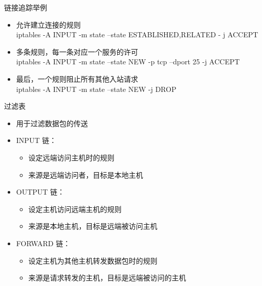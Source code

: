  \begin{frame}{链接追踪举例}
\begin{itemize}
\item 允许建立连接的规则\\
iptables -A INPUT -m state --state ESTABLISHED,RELATED - j ACCEPT
\item 多条规则，每一条对应一个服务的许可\\
iptables -A INPUT -m state --state NEW -p tcp --dport 25 -j ACCEPT
\item 最后，一个规则阻止所有其他入站请求\\
iptables -A INPUT -m state --state NEW -j DROP
\end{itemize}

\end{frame} 
 \begin{frame}{过滤表}


\begin{itemize}
\item 用于过滤数据包的传送
\item INPUT 链：

\begin{itemize}
\item 设定远端访问主机时的规则
\item 来源是远端访问者，目标是本地主机
\end{itemize}
\item OUTPUT 链：

\begin{itemize}
\item 设定主机访问远端主机的规则
\item 来源是本地主机，目标是远端被访问主机
\end{itemize}
\item FORWARD 链：

\begin{itemize}
\item 设定主机为其他主机转发数据包时的规则
\item 来源是请求转发的主机，目标是远端被访问的主机
\end{itemize}
\end{itemize}

\end{frame} 
